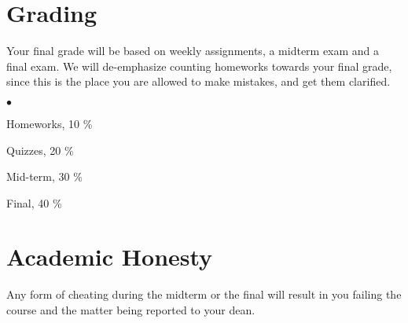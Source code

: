\documentclass[margin,line]{res}
\newenvironment{list2}{
  \begin{list}{$\bullet$}{%
      \setlength{\itemsep}{0in}
      \setlength{\parsep}{0in} \setlength{\parskip}{0in}
      \setlength{\topsep}{0in} \setlength{\partopsep}{0in}
      \setlength{\leftmargin}{0.2in}}}{\end{list}}
\begin{document}
\begin{resume}
\section{\sc Grading}
Your final grade will be based on weekly assignments, a midterm exam and a final exam. We will de-emphasize counting homeworks towards your final grade, since this is the place you are allowed to make mistakes, and get them clarified.
\\

\begin{list2}
\item Homeworks, 10 \%
\item Quizzes, 20 \%
\item Mid-term, 30 \%
\item Final, 40 \%
\end{list2}

\section{\sc Academic Honesty} Any form of
cheating during the midterm or the final will result in you failing the
course and the matter being reported to your dean.

\end{resume}
\end{document}
